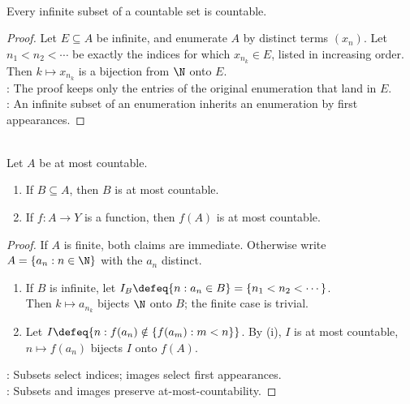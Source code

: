 \begin{theorem} \label{thm:infinite-subset-of-countable-is-countable} \\
Every infinite subset of a countable set is countable.
\begin{proof}
Let $E\subseteq A$ be infinite, and enumerate $A$ by distinct terms $(x_n)$. Let $n_1<n_2<\cdots$ be exactly the indices for which $x_{n_k}\in E$, listed in increasing order. Then $k\mapsto x_{n_k}$ is a bijection from $\N$ onto $E$.\\
: The proof keeps only the entries of the original enumeration that land in $E$.\\
: An infinite subset of an enumeration inherits an enumeration by first appearances.
\end{proof}
\end{theorem}

\begin{proposition} \label{prop:subsets-and-images-at-most-countable} \\
Let $A$ be at most countable.
\begin{enumerate}[label=(\roman*)]
\setlength{\itemsep}{0pt}
\item If $B\subseteq A$, then $B$ is at most countable.
\item If $f:A\to Y$ is a function, then $f(A)$ is at most countable.
\end{enumerate}
\begin{proof}
If $A$ is finite, both claims are immediate. Otherwise write $A=\{a_n:n\in\N\}$ with the $a_n$ distinct.
\begin{enumerate}[label=(\roman*)]
\setlength{\itemsep}{0pt}
\item If $B$ is infinite, let $I_B\defeq\{n:a_n\in B\}=\{n_1<n_2<\cdots\}$.\\
Then $k\mapsto a_{n_k}$ bijects $\N$ onto $B$; the finite case is trivial.
\item Let $I\defeq\{n:f(a_n)\notin\{f(a_m):m<n\}\}$. By (i), $I$ is at most countable, $n\mapsto f(a_n)$ bijects $I$ onto $f(A)$.
\end{enumerate}
: Subsets select indices; images select first appearances.\\
: Subsets and images preserve at-most-countability.
\end{proof}
\end{proposition}

